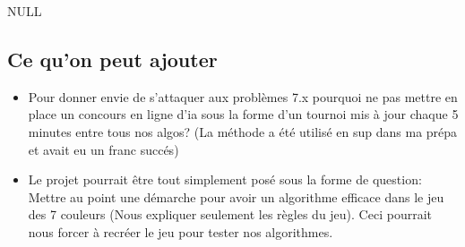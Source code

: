 \documentclass{article}
\begin{document}
    NULL

    \subsection*{Ce qu'on peut ajouter}
    \begin{itemize}
    \item Pour donner envie de s'attaquer aux problèmes 7.x pourquoi ne pas mettre en place un concours en ligne d'ia sous la forme d'un tournoi mis à jour chaque 5 minutes entre tous nos algos? (La méthode a été utilisé en sup dans ma prépa et avait eu un franc succés)

    \item Le projet pourrait être tout simplement posé sous la forme de question: Mettre au point une démarche pour avoir un algorithme efficace dans le jeu des 7 couleurs (Nous expliquer seulement les règles du jeu). Ceci pourrait nous forcer à recréer le jeu pour tester nos algorithmes.


    \end{itemize}
\end{document}
